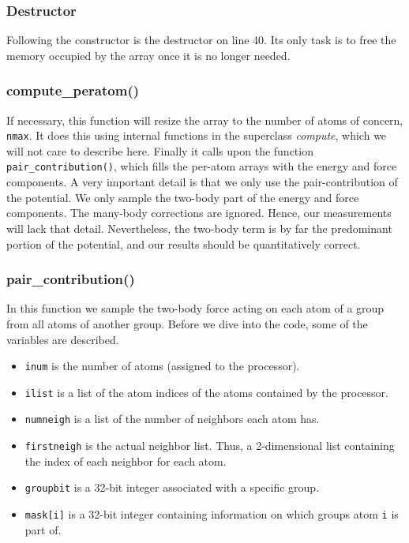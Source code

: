 \documentclass[twoside,english]{uiofysmaster}
\begin{document}
\subsubsection{Destructor}
Following the constructor is the destructor on line 40. Its only task is to free the memory occupied by the array once it is no longer needed.  

\subsubsection{compute\_peratom()}
 If necessary, this function will resize the array to the number of atoms of concern, \texttt{nmax}. 
 It does this using internal functions in the superclass \textit{compute}, which we will not care to describe here. 
 Finally it calls upon the function \texttt{pair\_contribution()}, which fills the per-atom arrays with the energy and force components. 
 A very important detail is that we only use the pair-contribution of the potential. 
 We only sample the two-body part of the energy and force components. 
The many-body corrections are ignored.
Hence, our measurements will lack that detail.
Nevertheless, the two-body term is by far the predominant portion of the potential, and our results should be quantitatively correct.  

\subsubsection{pair\_contribution()}
In this function we sample the two-body force acting on each atom of a group from all atoms of another group. 
Before we dive into the code, some of the variables are described.

\begin{itemize}
\item[] \texttt{inum} is the number of atoms (assigned to the processor).

\item[] \texttt{ilist} is a list of the atom indices of the atoms contained by the processor.

\item[] \texttt{numneigh} is a list of the number of neighbors each atom has.

\item[] \texttt{firstneigh} is the actual neighbor list. Thus, a 2-dimensional list containing the index of each neighbor for each atom.

\item[] \texttt{groupbit} is a 32-bit integer associated with a specific group. 

\item[] \texttt{mask[i]} is a 32-bit integer containing information on which groups atom \texttt{i} is part of.  
\end{itemize}
\end{document}
